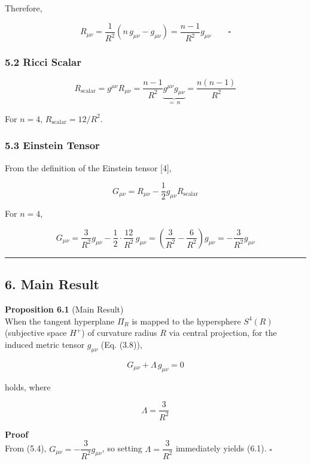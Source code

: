 \documentclass[a4paper,11pt]{article}
\theoremstyle{definition}
\begin{document}
Therefore,

\[R_{\mu\nu} = \frac{1}{R^2}(n\,g_{\mu\nu} - g_{\mu\nu}) = \frac{n-1}{R^2}g_{\mu\nu} \qquad \square\]

\subsubsection{5.2 Ricci Scalar}\label{ricci-scalar}

\[R_{\text{scalar}} = g^{\mu\nu}R_{\mu\nu} = \frac{n-1}{R^2}\underbrace{g^{\mu\nu}g_{\mu\nu}}_{=\,n} = \frac{n(n-1)}{R^2} \tag{5.2}\]

For \(n=4\), \(R_{\text{scalar}} = 12/R^2\).

\subsubsection{5.3 Einstein Tensor}\label{einstein-tensor}

From the definition of the Einstein tensor {[}4{]},

\[G_{\mu\nu} = R_{\mu\nu} - \frac{1}{2}g_{\mu\nu}R_{\text{scalar}} \tag{5.3}\]

For \(n=4\),

\[G_{\mu\nu} = \frac{3}{R^2}g_{\mu\nu} - \frac{1}{2}\cdot\frac{12}{R^2}\,g_{\mu\nu} = \left(\frac{3}{R^2} - \frac{6}{R^2}\right)g_{\mu\nu} = -\frac{3}{R^2}g_{\mu\nu} \tag{5.4}\]

\begin{center}\rule{0.5\linewidth}{0.5pt}\end{center}

\subsection{6. Main Result}\label{main-result}

\textbf{Proposition 6.1} (Main Result)\\
When the tangent hyperplane \(\Pi_R\) is mapped to the hypersphere \(S^4(R)\) (subjective space \(H^+\)) of curvature radius \(R\) via central projection, for the induced metric tensor \(g_{\mu\nu}\) (Eq. (3.8)),

\[G_{\mu\nu} + \Lambda\, g_{\mu\nu} = 0 \tag{6.1}\]

holds, where

\[\boxed{\Lambda = \frac{3}{R^2}} \tag{6.2}\]

\textbf{Proof}\\
From (5.4), \(G_{\mu\nu} = -\dfrac{3}{R^2}g_{\mu\nu}\), so setting \(\Lambda = \dfrac{3}{R^2}\) immediately yields (6.1). \(\square\)
\end{document}
